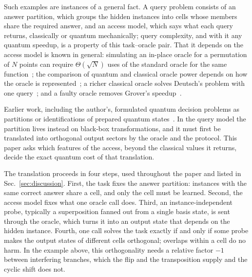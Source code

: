 \documentclass[
  aps,
  pra,
  reprint,
  nofootinbib
]{revtex4-2}
\begin{document}
Such examples are instances of a general fact. A query problem consists of an
answer partition, which groups the hidden instances into cells whose members
share the required answer, and an access model, which says what each query
returns, classically or quantum mechanically; query complexity, and with it
any quantum speedup, is a property of this task--oracle pair. That it depends
on the access model is known in general: simulating an in-place oracle for a permutation of \(N\) points can
require \(\Theta(\sqrt N)\) uses of the standard oracle for the same
function~\cite{KashefiKentVedralBanaszek2002}; the comparison of quantum and
classical oracle power depends on how the oracle is
represented~\cite{WojcikChhajlany2006};
a richer classical oracle solves Deutsch's problem with one
query~\cite{Calude2006Dequantising}; and a faulty oracle removes Grover's
speedup~\cite{RegevSchiff2008}.

Earlier work, including the author's, formulated quantum decision problems as
partitions or identifications of prepared quantum
states~\cite{DonSvo01,svozil-2002-statepart-prl,svozil-2003-garda,svozil-2005-ko,2007-tkadlec-svozil-springer,svozil-2016-vector}.
In the query model the partition lives instead on black-box transformations,
and it must first be translated into orthogonal output sectors by the oracle
and the protocol. This paper asks which features of the access, beyond the
classical values it returns, decide the exact quantum cost of that translation.

The translation proceeds in four steps, used throughout the paper and listed
in Sec.~\ref{sec:discussion}. First, the task fixes the answer partition:
instances with the same correct answer share a cell, and only the cell must be
learned. Second, the access model fixes what one oracle call does. Third, an
instance-independent probe, typically a superposition fanned out from a single
basis state, is sent through the oracle, which turns it into an output state
that depends on the hidden instance. Fourth, one call solves the task exactly
if and only if some probe makes the output states of different cells
orthogonal; overlaps within a cell do no harm. In the example above, this
orthogonality needs a relative factor \(-1\) between interfering branches,
which the flip and the transposition supply and the cyclic shift does not.
\end{document}
